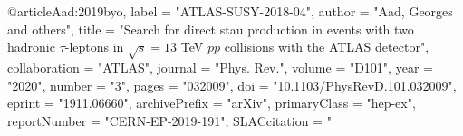 @article{Aad:2019byo,
      label          = "ATLAS-SUSY-2018-04",
      author         = "Aad, Georges and others",
      title          = "{Search for direct stau production in events with two
                        hadronic $\tau$-leptons in $\sqrt{s} = 13$ TeV $pp$
                        collisions with the ATLAS detector}",
      collaboration  = "ATLAS",
      journal        = "Phys. Rev.",
      volume         = "D101",
      year           = "2020",
      number         = "3",
      pages          = "032009",
      doi            = "10.1103/PhysRevD.101.032009",
      eprint         = "1911.06660",
      archivePrefix  = "arXiv",
      primaryClass   = "hep-ex",
      reportNumber   = "CERN-EP-2019-191",
      SLACcitation   = "%
}


